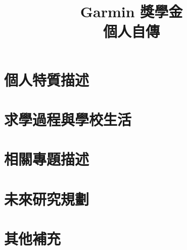 \documentclass{cover-letter}
\begin{document}
\title{Garmin 獎學金 \\ 個人自傳}
\author{\texorpdfstring{\chineseMasterUniversity \chineseMasterInstitute \quad \chineseName}{\chineseMasterUniversity \chineseMasterInstitute \chineseName}}
\date{}
\maketitle

\thispagestyle{fancy}

\tableofcontents

\clearpage

\section{個人特質描述}


\section{求學過程與學校生活}


\section{相關專題描述}


\section{未來研究規劃}


\section{其他補充}

\end{document}
